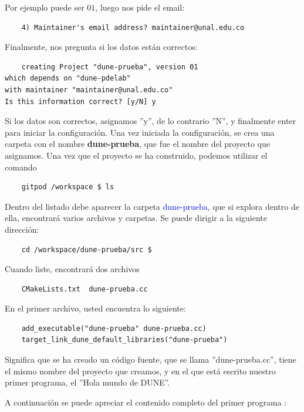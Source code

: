 Por ejemplo puede ser $01$, luego nos pide el email:
\begin{verbatim}
	4) Maintainer's email address? maintainer@unal.edu.co 
\end{verbatim}
Finalmente, nos pregunta si los datos están correctos:
\begin{verbatim}
	creating Project "dune-prueba", version 01 
which depends on "dune-pdelab"
with maintainer "maintainer@unal.edu.co"
Is this information correct? [y/N] y
\end{verbatim}
Si los datos son correctos, asignamos ''y'', de lo contrario ''N'', y finalmente enter para iniciar la configuración. Una vez iniciada la configuración,
se crea una carpeta con el nombre \textbf{dune-prueba}, que fue el nombre del proyecto que asignamos.  Una vez que 
el proyecto se ha construido, podemos utilizar el comando \begin{verbatim}
	gitpod /workspace $ ls
\end{verbatim}
Dentro del listado debe aparecer la carpeta \textcolor{blue}{dune-prueba}, que si explora dentro de ella, encontrará 
varios archivos y carpetas.  Se puede dirigir a la siguiente dirección: {\begin{verbatim}
	cd /workspace/dune-prueba/src $ 
\end{verbatim}}Cuando liste, encontrará dos archivos \begin{verbatim}
	CMakeLists.txt  dune-prueba.cc
\end{verbatim}
En el primer archivo, usted encuentra lo siguiente:
\begin{verbatim}
	add_executable("dune-prueba" dune-prueba.cc)
	target_link_dune_default_libraries("dune-prueba")
\end{verbatim} 
Significa que se ha creado un código fuente, que se llama ''dune-prueba.cc'', tiene el mismo nombre del proyecto que 
creamos, y en el que está escrito nuestro primer programa, el ''Hola mundo de DUNE''.

A continuación se puede apreciar el contenido completo del primer programa :
\begin{listing}
	\inputminted{cpp}{../../src/dune-learn.cc}
\end{listing}
